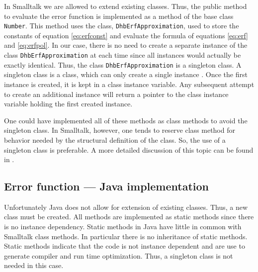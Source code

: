 \documentclass[twoside]{book}
\begin{document}
In Smalltalk we are allowed to extend existing classes. Thus, the
public method to evaluate the error function is implemented as a
method of the base class {\tt Number}. This method uses the class,
{\tt DhbErfApproximation}, used to store the constants of equation
\ref{eq:erfconst} and evaluate the formula of equations
\ref{eq:erf} and \ref{eq:erfpol}. In our case, there is no need to
create a separate instance of the class {\tt DhbErfApproximation}
at each time since all instances would actually be exactly
identical. Thus, the class {\tt DhbErfApproximation} is a
singleton class. A singleton class is a class, which can only
create a single instance \cite{GoF}. Once the first instance is
created, it is kept in a class instance variable. Any subsequent
attempt to create an additional instance will return a pointer to
the class instance variable holding the first created instance.

One could have implemented all of these methods as class methods
to avoid the singleton class. In Smalltalk, however, one tends to
reserve class method for behavior needed by the structural
definition of the class. So, the use of a singleton class is
preferable. A more detailed discussion of this topic can be found
in \cite{StDesPat}.

\begin{listing}
\label{ls:errorFunction}


\end{listing}

\subsection{Error function --- Java implementation}
 Unfortunately Java does not allow for
extension of existing classes. Thus, a new class must be created.
All methods are implemented as static methods since there is no
instance dependency. Static methods in Java have little in common
with Smalltalk class methods. In particular there is no
inheritance of static methods. Static methods indicate that the
code is not instance dependent and are use to generate compiler
and run time optimization. Thus, a singleton class is not needed
in this case.
\end{document}

